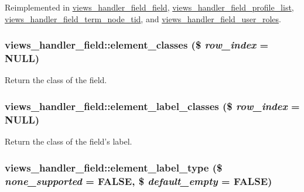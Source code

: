 Reimplemented in \hyperlink{classviews__handler__field__field_a1e4563c5085f7188e85278770098bee0}{views\_\-handler\_\-field\_\-field}, \hyperlink{classviews__handler__field__profile__list_ab3950ce980ce3c8e8ce274a25b4e3351}{views\_\-handler\_\-field\_\-profile\_\-list}, \hyperlink{classviews__handler__field__term__node__tid_afa909e51eb90573d468deb29a3943d94}{views\_\-handler\_\-field\_\-term\_\-node\_\-tid}, and \hyperlink{classviews__handler__field__user__roles_a49745a7c1d16f9ee62d5ad6406fe0863}{views\_\-handler\_\-field\_\-user\_\-roles}.\hypertarget{classviews__handler__field_a80e76c44527962cc47a29d5dcdc7cd31}{
\subsubsection[{element\_\-classes}]{\setlength{\rightskip}{0pt plus 5cm}views\_\-handler\_\-field::element\_\-classes (\$ {\em row\_\-index} = {\ttfamily NULL})}}
\label{classviews__handler__field_a80e76c44527962cc47a29d5dcdc7cd31}
Return the class of the field. \hypertarget{classviews__handler__field_a7c31860b58425cbd34ffdf4b6ea98203}{
\subsubsection[{element\_\-label\_\-classes}]{\setlength{\rightskip}{0pt plus 5cm}views\_\-handler\_\-field::element\_\-label\_\-classes (\$ {\em row\_\-index} = {\ttfamily NULL})}}
\label{classviews__handler__field_a7c31860b58425cbd34ffdf4b6ea98203}
Return the class of the field's label. \hypertarget{classviews__handler__field_ac0ba0ea52c53f0695bfba23bd6fa627f}{
\subsubsection[{element\_\-label\_\-type}]{\setlength{\rightskip}{0pt plus 5cm}views\_\-handler\_\-field::element\_\-label\_\-type (\$ {\em none\_\-supported} = {\ttfamily FALSE}, \/  \$ {\em default\_\-empty} = {\ttfamily FALSE})}}
